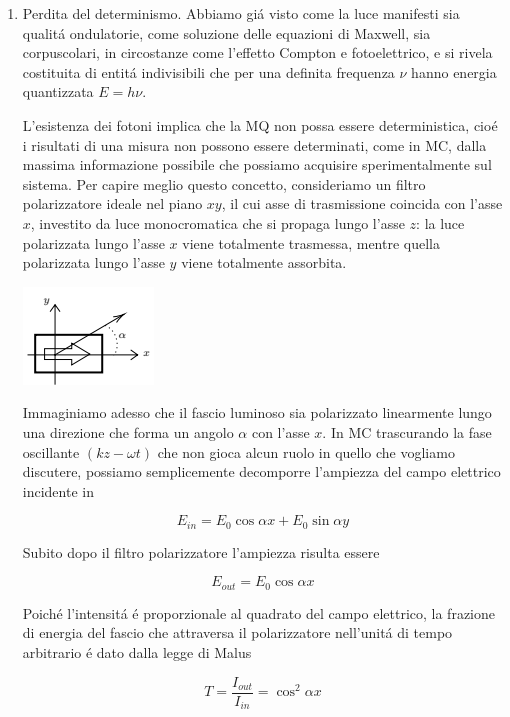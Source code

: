 \documentclass[a4paper]{article}
\numberwithin{equation}{section}
\begin{document}
\begin{enumerate}
\item Perdita del determinismo. Abbiamo gi\'a visto come la luce manifesti sia qualit\'a ondulatorie, come soluzione delle equazioni di Maxwell, sia corpuscolari, in circostanze come l'effetto Compton e fotoelettrico, e si rivela costituita di entit\'a indivisibili che per una definita frequenza $\nu$ hanno energia quantizzata $E = h\nu$.

L'esistenza dei fotoni implica che la MQ non possa essere deterministica, cio\'e i risultati di una misura non possono essere determinati, come in MC, dalla massima informazione possibile che possiamo acquisire sperimentalmente sul sistema. Per capire meglio questo concetto, consideriamo un filtro polarizzatore ideale nel piano $xy$, il cui asse di trasmissione coincida con l'asse $x$, investito da luce monocromatica che si propaga lungo l'asse $z$: la luce polarizzata lungo l'asse $x$ viene totalmente trasmessa, mentre quella polarizzata lungo l'asse $y$ viene totalmente assorbita.

\begin{center}
	\includegraphics[width=0.2\linewidth]{immagini/5_image_0.png}
\end{center}

Immaginiamo adesso che il fascio luminoso sia polarizzato linearmente lungo una direzione che forma un angolo $\alpha$ con l'asse $x$. In MC trascurando la fase oscillante $(kz - \omega t)$ che non gioca alcun ruolo in quello che vogliamo discutere, possiamo semplicemente decomporre l'ampiezza del campo elettrico incidente in

$$E_{i n}=E_{0}\cos\alpha x+E_{0}\sin\alpha y$$

Subito dopo il filtro polarizzatore l'ampiezza risulta essere

$$E_{o u t}=E_{0}\cos\alpha x$$

Poich\'e l'intensit\'a \'e proporzionale al quadrato del campo elettrico, la frazione di energia del fascio che attraversa il polarizzatore nell'unit\'a di tempo arbitrario \'e dato dalla legge di Malus

$$T={\frac{I_{o u t}}{I_{i n}}}=\cos^{2}\alpha x$$


\end{enumerate}
\end{document}
